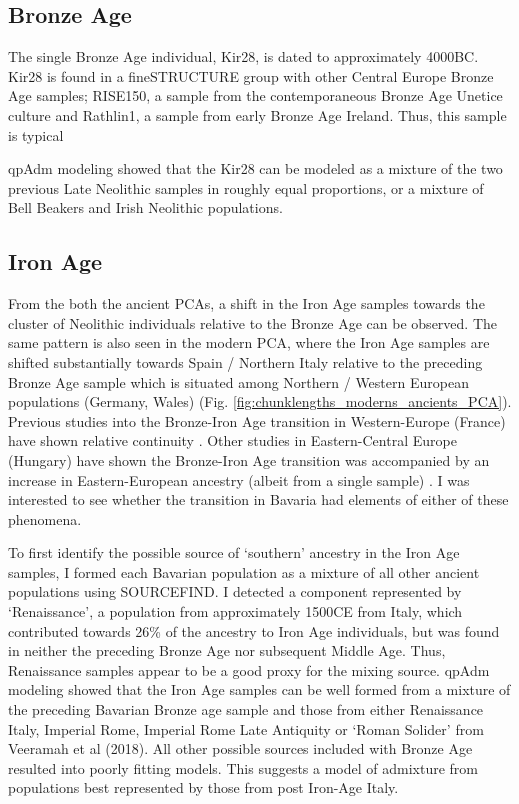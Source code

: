 \subsection{Bronze Age}

The single  Bronze Age individual, Kir28, is dated to approximately 4000BC. Kir28 is found in a fineSTRUCTURE group with other Central Europe Bronze Age samples; RISE150, a sample from the contemporaneous Bronze Age Unetice culture and Rathlin1, a sample from  early Bronze Age Ireland. Thus, this sample is typical

qpAdm modeling showed that the Kir28 can be modeled as a mixture of the two previous Late Neolithic samples in roughly equal proportions, or a mixture of Bell Beakers and Irish Neolithic populations. 

\subsection{Iron Age}

From the both the ancient PCAs, a shift in the Iron Age samples towards the cluster of Neolithic individuals relative to the Bronze Age can be observed. The same pattern is also seen in the modern PCA, where the Iron Age samples are shifted substantially towards Spain / Northern Italy relative to the preceding Bronze Age sample which is situated among Northern / Western European populations (Germany, Wales) (Fig. \ref{fig:chunklengths_moderns_ancients_PCA}). Previous studies into the Bronze-Iron Age transition in Western-Europe (France) have shown relative continuity \cite{Brunel12791}. Other studies in Eastern-Central Europe (Hungary) have shown the Bronze-Iron Age transition was accompanied by an increase in Eastern-European ancestry (albeit from a single sample) \cite{Gamba2014}. I was interested to see whether the transition in Bavaria had elements of either of these phenomena. 

To first identify the possible source of `southern' ancestry in the Iron Age samples, I formed each Bavarian population as a mixture of all other ancient populations using SOURCEFIND. I detected a component represented by `Renaissance', a population from approximately 1500CE from Italy, which contributed towards 26\% of the ancestry to Iron Age individuals, but was found in neither the preceding Bronze Age nor subsequent Middle Age. Thus, Renaissance samples appear to be a good proxy for the mixing source. qpAdm modeling showed that the Iron Age samples can be well formed from a mixture of the preceding Bavarian Bronze age sample and those from either Renaissance Italy, Imperial Rome, Imperial Rome Late Antiquity or `Roman Solider' from Veeramah et al (2018). All other possible sources included with Bronze Age resulted into poorly fitting models. This suggests a model of admixture from populations best represented by those from post Iron-Age Italy. 

